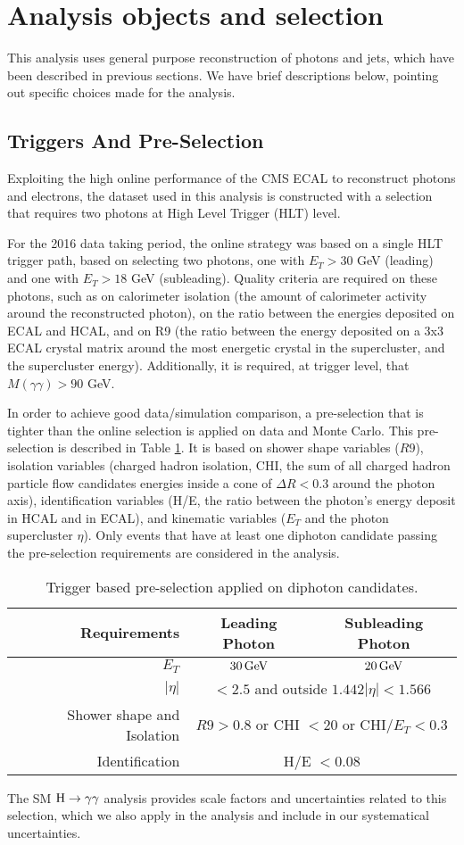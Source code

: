 \section{Analysis objects and selection}
This analysis uses general purpose reconstruction of photons and jets, which have been described in previous sections. 
We have brief descriptions below, pointing out specific choices made for the analysis.

\subsection{Triggers And Pre-Selection}
\label{sec:trigger}
Exploiting the high online performance of the CMS ECAL to reconstruct photons and electrons, the dataset used in this analysis is constructed with a selection that requires two photons at High Level Trigger (HLT) level.

For the 2016 data taking period, the online strategy was based on a single HLT trigger path, based on selecting two photons, one with $E_T > 30$ GeV (leading) and one with $E_T > 18$ GeV (subleading). Quality criteria are required on these photons, such as on calorimeter isolation (the amount of calorimeter activity around the reconstructed photon), on the ratio between the energies deposited on ECAL and HCAL, and on R9 (the ratio between the energy deposited on a 3x3 ECAL crystal matrix around the most energetic crystal in the supercluster, and the supercluster energy). 
Additionally, it is required, at trigger level, that $M(\gamma\gamma)>90$ GeV. 

In order to achieve good data/simulation comparison, a pre-selection that is tighter than the online selection is applied on data and Monte Carlo. This pre-selection is described in Table \ref{tab:preselection}. 
It is based on shower shape variables ($R9$), isolation variables (charged hadron isolation, CHI, the sum of all charged hadron particle flow candidates energies inside a cone of $\Delta R < 0.3$ around the photon axis), identification variables (H/E, the ratio between the photon's energy deposit in HCAL and in ECAL), and kinematic variables ($E_{T}$ and the photon supercluster $\eta$). Only events that have at least one diphoton candidate passing the pre-selection requirements are considered in the analysis.

 \begin{table}[h]
\centering
\small{
\begin{tabular}{rcc}
Requirements & Leading Photon & Subleading Photon \\ \hline
$E_{T}$ & $30 \,\text{Ge\hspace{-.08em}V}$ & $20 \,\text{Ge\hspace{-.08em}V}$ \\ \hline
$|\eta|$ & \multicolumn{2}{c}{ $< 2.5$ and outside $1.442  |\eta| < 1.566$ } \\ \hline
Shower shape and Isolation & \multicolumn{2}{c}{ $R9 > 0.8$ or CHI $< 20$ or CHI/$E_{T} < 0.3$} \\ \hline
Identification & \multicolumn{2}{c}{ H/E $< 0.08$} \\ \hline
\end{tabular}
}
\caption{\small Trigger based pre-selection applied on diphoton candidates.  \label{tab:preselection}}
\end{table}

The SM $\mathrm{H}\to\gamma\gamma$ analysis provides scale factors and uncertainties related to this selection, which we also apply in the analysis and include in our systematical uncertainties. 
